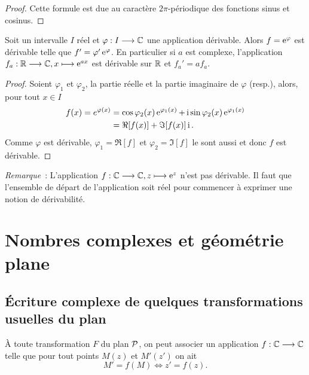 \begin{proof}
    Cette formule est due au caractère \(2\pi\)-périodique des fonctions sinus 
    et cosinus.
\end{proof}

\begin{prop}
    Soit un intervalle \(I\) réel et \(\fonctionR{\varphi}{I}{\C}\) une application 
    dérivable. Alors \(f = \e^\varphi\) est dérivable telle que \(f' = \varphi' 
    \e^\varphi\). En particulier si \(a\) est complexe, l'application 
    \(\fonctionL{f_a}{\R}{\C}{x}{\e^{ax}}\) est dérivable sur \(\R\) et \(f_a' = 
    af_a\).
\end{prop}

\begin{proof}
    Soient \(\varphi_1\) et \(\varphi_2\), la partie réelle et la partie 
    imaginaire de \(\varphi\) (resp.), alors, pour tout \(x \in I\)
    \begin{align*}
         f(x) = e^{\varphi(x)}& = \cos \varphi_2(x) \e^{\varphi_1(x)}+ \ii \sin 
         \varphi_2(x)\e^{\varphi_1(x)}\\ 
                              & = \Re[f(x)] + \Im[f(x)]\ii.
    \end{align*}
    Comme \(\varphi\) est dérivable, \(\varphi_1 = \Re[f]\) et \(\varphi_2 = 
    \Im[f]\) le sont aussi et donc \(f\) est dérivable.
\end{proof}

\emph{Remarque}~: L'application \(\fonctionL{f}{\C}{\C}{z}{\e^z}\) n'est pas 
dérivable. Il faut que l'ensemble de départ de l'application soit réel pour 
commencer à exprimer une notion de dérivabilité.

\section{Nombres complexes et géométrie plane}
\label{sec:complexesetgeometrie}

\subsection{Écriture complexe de quelques transformations usuelles du plan}
\label{subsec:ecriturecomplexeettransformations}

À toute transformation \(F\) du plan \(\P\), on peut associer un application 
\(\fonctionR{f}{\C}{\C}\) telle que pour tout points \(M(z)\) et \(M'(z')\) on 
ait
\begin{equation}
    M' = f(M) \iff z' = f(z).
\end{equation}

